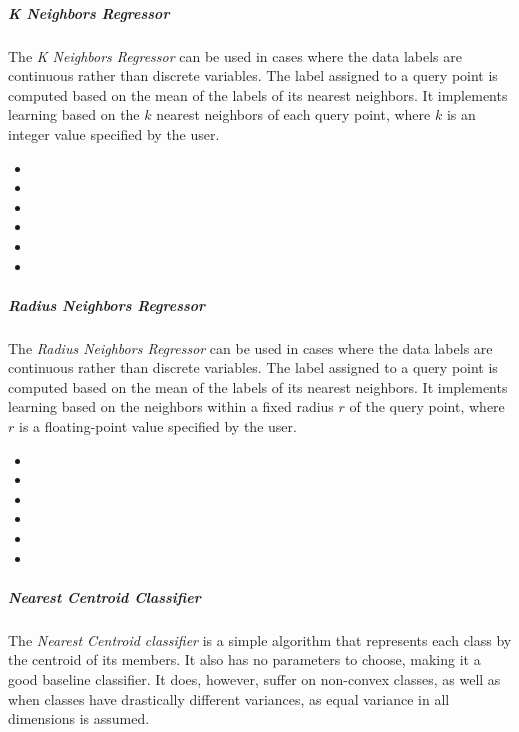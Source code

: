 \subparagraph{K Neighbors Regressor}
\mbox{}

The \textit{K Neighbors Regressor} can be used in cases where the data labels
are continuous rather than discrete variables.
%
The label assigned to a query point is computed based on the mean of the labels
of its nearest neighbors.
%
It implements learning based on the $k$ nearest neighbors of each query point,
where $k$ is an integer value specified by the user.

\begin{itemize}
  \item {}
  \item {}
  \item {}
  \item {}
  \item {}
  \item {}
\end{itemize}

\subparagraph{Radius Neighbors Regressor}
\mbox{}

The \textit{Radius Neighbors Regressor} can be used in cases where the data
labels are continuous rather than discrete variables.
%
The label assigned to a query point is computed based on the mean of the labels
of its nearest neighbors.
%
It implements learning based on the neighbors within a fixed radius $r$ of the
query point, where $r$ is a floating-point value specified by the user.

\begin{itemize}
  \item {}
  \item {}
  \item {}
  \item {}
  \item {}
  \item {}
\end{itemize}
\subparagraph{Nearest Centroid Classifier}
\mbox{}

The \textit{Nearest Centroid classifier} is a simple algorithm that represents
each class by the centroid of its members.
%
It also has no parameters to choose, making it a good baseline classifier.
%
It does, however, suffer on non-convex classes, as well as when classes have
drastically different variances, as equal variance in all dimensions is assumed.

